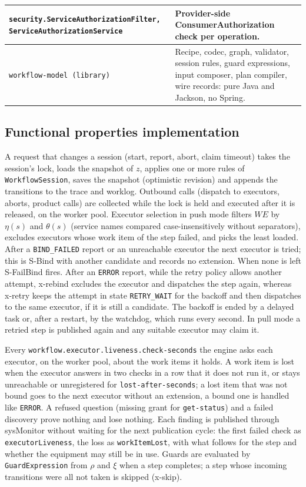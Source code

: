 \documentclass[a4paper]{arrowhead}
\begin{document}
{\begin{longtable}{|p{6.2cm}|p{9.6cm}|}
{\footnotesize \texttt{security.\allowbreak{}ServiceAuthorizationFilter,\allowbreak{} ServiceAuthorizationService}} & Provider-side ConsumerAuthorization check per operation. \\ \hline
{\footnotesize \texttt{workflow-\allowbreak{}model (library)}} & Recipe, codec, graph, validator, session rules, guard expressions, input composer, plan compiler, wire records: pure Java and Jackson, no Spring. \\ \hline
\end{longtable}
}


\subsection{Functional properties implementation}
A request that changes a session (start, report, abort, claim timeout) takes the session's lock, loads the
snapshot of $z$, applies one or more rules of \texttt{Workflow\allowbreak{}Session}, saves the snapshot (optimistic revision) and
appends the transitions to the trace and worklog. Outbound calls (dispatch to executors, aborts, product calls) are
collected while the lock is held and executed after it is released, on the worker pool. Executor selection in push mode
filters $WE$ by $\eta(s)$ and $\theta(s)$ (service names compared case-insensitively without separators), excludes
executors whose work item of the step failed, and picks the least loaded. After a \texttt{BIND\_FAILED} report or an
unreachable executor the next executor is tried; this is S-Bind with another candidate and records no extension. When
none is left S-FailBind fires. After an \texttt{ERROR} report, while the retry policy allows another attempt, x-rebind
excludes the executor and dispatches the step again, whereas x-retry keeps the attempt in state \texttt{RETRY\_WAIT} for
the backoff and then dispatches to the same executor, if it is still a candidate. The backoff is ended by a delayed task
or, after a restart, by the watchdog, which runs every second. In pull mode a retried step is published again and any
suitable executor may claim it.

Every \texttt{workflow.\allowbreak{}executor.\allowbreak{}liveness.\allowbreak{}check-\allowbreak{}seconds} the engine asks each executor, on the worker pool, about the
work items it holds. A work item is lost when the executor answers in two checks in a row that it does not run it, or
stays unreachable or unregistered for \texttt{lost-\allowbreak{}after-\allowbreak{}seconds}; a lost item that was not bound goes to the next
executor without an extension, a bound one is handled like \texttt{ERROR}. A refused question (missing grant for
\texttt{get-status}) and a failed discovery prove nothing and lose nothing. Each finding is published through sysMonitor
without waiting for the next publication cycle: the first failed check as \texttt{executor\allowbreak{}Liveness}, the loss as
\texttt{workItemLost}, with what follows for the step and whether the equipment may still be in use. Guards are evaluated by
\texttt{Guard\allowbreak{}Expression} from $\rho$ and $\xi$ when a step completes; a step whose incoming transitions were all not
taken is skipped (x-skip).
\end{document}

